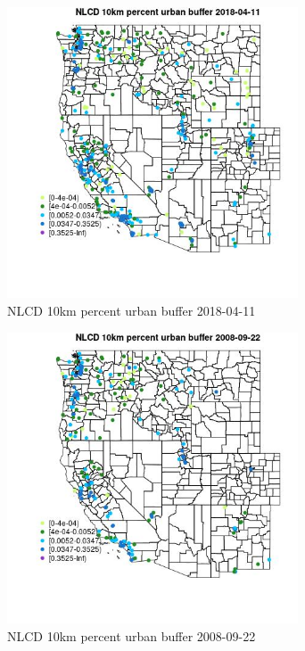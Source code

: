 \begin{figure} 
\centering  
\includegraphics[width=0.77\textwidth]{Code_Outputs/Report_ML_input_PM25_Step4_part_e_de_duplicated_aves_compiled_2019-05-18wNAs_MapObsNLCD_10km_percent_urban_buffer2018-04-11.jpg} 
\caption{\label{fig:Report_ML_input_PM25_Step4_part_e_de_duplicated_aves_compiled_2019-05-18wNAsMapObsNLCD_10km_percent_urban_buffer2018-04-11}NLCD 10km percent urban buffer 2018-04-11} 
\end{figure} 
 

\clearpage 

\begin{figure} 
\centering  
\includegraphics[width=0.77\textwidth]{Code_Outputs/Report_ML_input_PM25_Step4_part_e_de_duplicated_aves_compiled_2019-05-18wNAs_MapObsNLCD_10km_percent_urban_buffer2008-09-22.jpg} 
\caption{\label{fig:Report_ML_input_PM25_Step4_part_e_de_duplicated_aves_compiled_2019-05-18wNAsMapObsNLCD_10km_percent_urban_buffer2008-09-22}NLCD 10km percent urban buffer 2008-09-22} 
\end{figure} 
 

